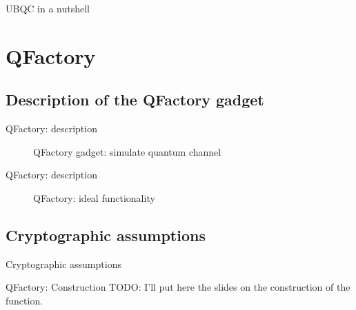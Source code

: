 \documentclass[]{beamer}
\begin{document}
\begin{frame}{UBQC in a nutshell}
  \begin{figure}[ht]
    \centering
  \end{figure}
\end{frame}

\section{QFactory}

\subsection{Description of the QFactory gadget}

\begin{frame}{QFactory: description}
  \begin{figure}[ht]
    \centering
    \caption{QFactory gadget: simulate quantum channel}
  \end{figure}
\end{frame}


\begin{frame}{QFactory: description}
  \begin{figure}[ht]
    \centering
    \caption{QFactory: ideal functionality}
  \end{figure}
\end{frame}

\subsection{Cryptographic assumptions}

\begin{frame}{Cryptographic assumptions}
  \begin{figure}[ht]
    \centering
  \end{figure}
\end{frame}

\begin{frame}{QFactory: Construction}
  TODO: I'll put here the slides on the construction of the function.
\end{frame}
\end{document}
